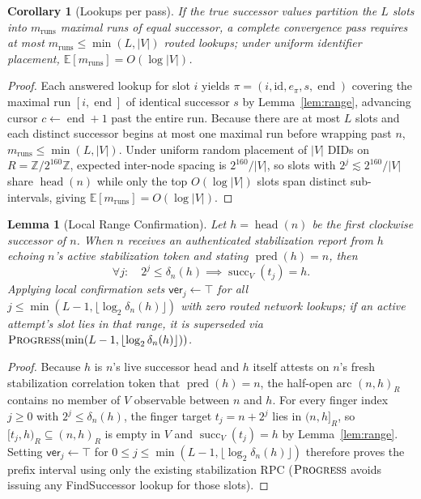 \documentclass[journal]{IEEEtran}
\newtheorem{lemma}{Lemma}
\newtheorem{corollary}{Corollary}
\DeclareRobustCommand{\code}[1]{{\ttfamily\renewcommand{\_}{\textunderscore\allowbreak}#1}}
\begin{document}
\begin{corollary}[Lookups per pass]\label{cor:lookups}
If the true successor values partition the $L$ slots into $m_{\mathrm{runs}}$ maximal runs of
equal successor, a complete convergence pass requires at most $m_{\mathrm{runs}}\le\min(L,|V|)$
routed lookups; under uniform identifier placement, $\mathbb{E}[m_{\mathrm{runs}}]=O(\log |V|)$.
\end{corollary}
\begin{proof}
Each answered lookup for slot $i$ yields $\pi=(i,\mathrm{id},e_\pi,s,\operatorname{end})$ covering the maximal run $[i,\operatorname{end}]$ of identical successor $s$ by Lemma~\ref{lem:range}, advancing cursor $c\gets\operatorname{end}+1$ past the entire run. Because there are at most $L$ slots and each distinct successor begins at most one maximal run before wrapping past $n$, $m_{\mathrm{runs}}\le\min(L,|V|)$. Under uniform random placement of $|V|$ DIDs on $R=\mathbb{Z}/2^{160}\mathbb{Z}$, expected inter-node spacing is $2^{160}/|V|$, so slots with $2^j\lesssim 2^{160}/|V|$ share $\operatorname{head}(n)$ while only the top $O(\log |V|)$ slots span distinct sub-intervals, giving $\mathbb{E}[m_{\mathrm{runs}}]=O(\log |V|)$.
\end{proof}

\begin{lemma}[Local Range Confirmation]\label{lem:local-range}
Let $h=\operatorname{head}(n)$ be the first clockwise successor of $n$.  When
$n$ receives an authenticated stabilization report from $h$ echoing $n$'s
active stabilization token and stating $\operatorname{pred}(h)=n$, then
\[
  \forall j:\quad 2^j\le\delta_n(h) \implies \operatorname{succ}_V(t_j)=h.
\]
Applying local confirmation sets $\mathsf{ver}_j\gets\top$ for all
$j\le\min(L-1,\lfloor\log_2\delta_n(h)\rfloor)$ with zero routed network lookups; if an
active attempt's slot lies in that range, it is superseded via
$\textsc{Progress}(\min(L-1,\lfloor\log_2\delta_n(h)\rfloor))$.
\end{lemma}
\begin{proof}
Because $h$ is $n$'s live successor head and $h$ itself attests on $n$'s fresh stabilization correlation token that $\operatorname{pred}(h)=n$, the half-open arc $(n,h)_R$ contains no member of $V$ observable between $n$ and $h$. For every finger index $j\ge 0$ with $2^j\le\delta_n(h)$, the finger target $t_j=n+2^j$ lies in $(n,h]_R$, so $[t_j,h)_R\subseteq(n,h)_R$ is empty in $V$ and $\operatorname{succ}_V(t_j)=h$ by Lemma~\ref{lem:range}. Setting $\mathsf{ver}_j\gets\top$ for $0\le j\le\min(L-1,\lfloor\log_2\delta_n(h)\rfloor)$ therefore proves the prefix interval using only the existing stabilization RPC ($\textsc{Progress}$ avoids issuing any \code{FindSuccessor} lookup for those slots).
\end{proof}
\end{document}
